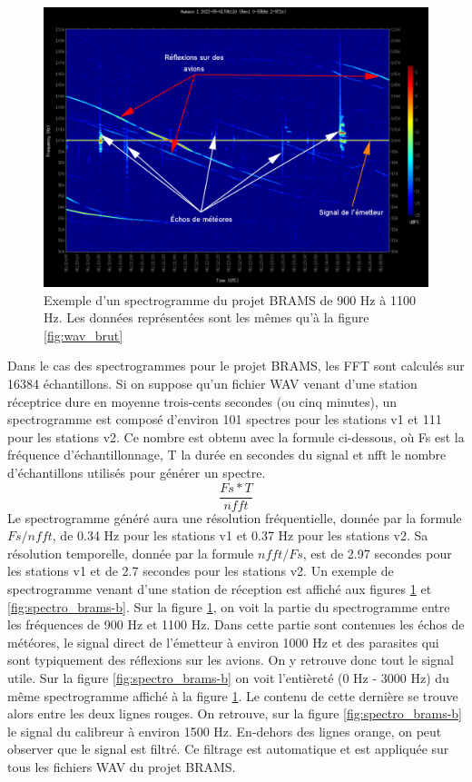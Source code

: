 \documentclass[11pt]{article}
\begin{document}
\begin{figure}[h]
    \begin{center}
        \includegraphics[scale=0.29]{spectrogramme_legend.png}
        \caption{Exemple d'un spectrogramme du projet BRAMS de 900 Hz à 1100 Hz. Les données représentées sont les mêmes qu'à la figure \ref{fig:wav_brut}}
        \label{fig:spectro_brams-a}
    \end{center}
\end{figure}

Dans le cas des spectrogrammes pour le projet BRAMS, les FFT sont calculés sur 16384 échantillons.
Si on suppose qu'un fichier WAV venant d'une station réceptrice dure en moyenne trois-cents secondes (ou cinq minutes), un spectrogramme est composé d'environ 101 spectres pour les stations v1 et 111 pour les stations v2.
Ce nombre est obtenu avec la formule ci-dessous, où Fs est la fréquence d'échantillonnage, T la durée en secondes du signal et nfft le nombre d'échantillons utilisés pour générer un spectre.
\[\frac{Fs * T}{nfft}\]
Le spectrogramme généré aura une résolution fréquentielle, donnée par la formule \(Fs / nfft\), de 0.34 Hz pour les stations v1 et 0.37 Hz pour les stations v2.
Sa résolution temporelle, donnée par la formule \(nfft / Fs\), est de 2.97 secondes pour les stations v1 et de 2.7 secondes pour les stations v2.
Un exemple de spectrogramme venant d'une station de réception est affiché aux figures \ref{fig:spectro_brams-a} et \ref{fig:spectro_brams-b}.
Sur la figure \ref{fig:spectro_brams-a}, on voit la partie du spectrogramme entre les fréquences de 900 Hz et 1100 Hz.
Dans cette partie sont contenues les échos de météores, le signal direct de l'émetteur à environ 1000 Hz et des parasites qui sont typiquement des réflexions sur les avions.
On y retrouve donc tout le signal utile.
Sur la figure \ref{fig:spectro_brams-b} on voit l'entièreté (0 Hz - 3000 Hz) du même spectrogramme affiché à la figure \ref{fig:spectro_brams-a}.
Le contenu de cette dernière se trouve alors entre les deux lignes rouges.
On retrouve, sur la figure \ref{fig:spectro_brams-b} le signal du calibreur à environ 1500 Hz.
En-dehors des lignes orange, on peut observer que le signal est filtré.
Ce filtrage est automatique et est appliquée sur tous les fichiers WAV du projet BRAMS.
\end{document}

